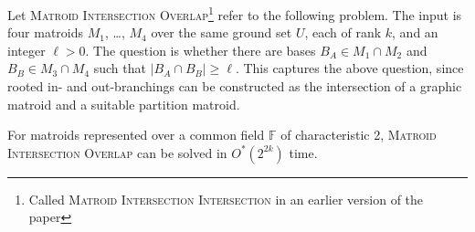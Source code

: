 \documentclass{theoretics}
\newcommand{\F}{\ensuremath{\mathbb F}\xspace}
\begin{document}
Let \textsc{Matroid Intersection Overlap}\footnote{Called
  \textsc{Matroid Intersection Intersection} in an earlier version of
  the paper} refer to the
following problem. The input is four matroids $M_1$, \ldots, $M_4$
over the same ground set $U$, each of rank $k$, and an integer $\ell>0$.
The question is whether there are bases $B_A \in M_1 \cap M_2$
and $B_B \in M_3 \cap M_4$ such that $|B_A \cap B_B| \geq \ell$.
This captures the above question, since rooted in- and
out-branchings can be constructed as the intersection of a graphic
matroid and a suitable partition matroid. 

\begin{lemma}
  For matroids represented over a common field $\F$ of characteristic 2, 
  \textsc{Matroid Intersection Overlap} can be solved in
  $O^*(2^{2k})$ time. 
\end{lemma}
\end{document}
